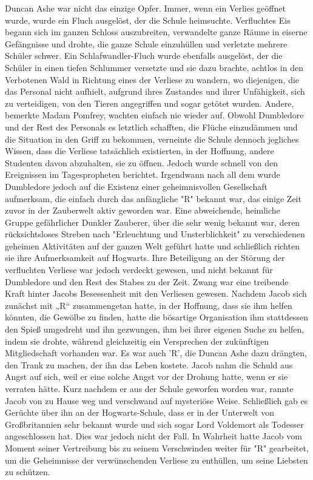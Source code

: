 \documentclass[a4paper, 10pt]{article}
\begin{document}
Duncan Ashe war nicht das einzige Opfer. Immer, wenn ein Verlies geöffnet wurde, wurde ein Fluch ausgelöst, der die Schule heimsuchte. Verfluchtes Eis begann sich im ganzen Schloss auszubreiten, verwandelte ganze Räume in eiserne Gefängnisse und drohte, die ganze Schule einzuhüllen und verletzte mehrere Schüler schwer. Ein Schlafwandler-Fluch wurde ebenfalls ausgelöst, der die Schüler in einen tiefen Schlummer versetzte und sie dazu brachte, achtlos in den Verbotenen Wald in Richtung eines der Verliese zu wandern, wo diejenigen, die das Personal nicht aufhielt, aufgrund ihres Zustandes und ihrer Unfähigkeit, sich zu verteidigen, von den Tieren angegriffen und sogar getötet wurden. Andere, bemerkte Madam Pomfrey, wachten einfach nie wieder auf. Obwohl Dumbledore und der Rest des Personals es letztlich schafften, die Flüche einzudämmen und die Situation in den Griff zu bekommen, verneinte die Schule dennoch jegliches Wissen, dass die Verliese tatsächlich existierten, in der Hoffnung, andere Studenten davon abzuhalten, sie zu öffnen. Jedoch wurde schnell von den Ereignissen im Tagespropheten berichtet.
\vspace{10pt}
\newline
{}  
Irgendwann nach all dem wurde Dumbledore jedoch auf die Existenz einer geheimnisvollen Gesellschaft aufmerksam, die einfach durch das anfängliche "R" bekannt war, das einige Zeit zuvor in der Zauberwelt aktiv geworden war. Eine abweichende, heimliche Gruppe gefährlicher Dunkler Zauberer, über die sehr wenig bekannt war, deren rücksichtsloses Streben nach "Erleuchtung und Unsterblichkeit" zu verschiedenen geheimen Aktivitäten auf der ganzen Welt geführt hatte und schließlich richten sie ihre Aufmerksamkeit auf Hogwarts. Ihre Beteiligung an der Störung der verfluchten Verliese war jedoch verdeckt gewesen, und nicht bekannt für Dumbledore und den Rest des Stabes zu der Zeit. Zwang war eine treibende Kraft hinter Jacobs Besessenheit mit den Verliesen gewesen. Nachdem Jacob sich zunächst mit „R“ zusammengetan hatte, in der Hoffnung, dass sie ihm helfen könnten, die Gewölbe zu finden, hatte die bösartige Organisation ihm stattdessen den Spieß umgedreht und ihn gezwungen, ihm bei ihrer eigenen Suche zu helfen, indem sie drohte, während gleichzeitig ein Versprechen der zukünftigen Mitgliedschaft vorhanden war. Es war auch 'R', die Duncan Ashe dazu drängten, den Trank zu machen, der ihn das Leben kostete. Jacob nahm die Schuld aus Angst auf sich, weil er eine solche Angst vor der Drohung hatte, wenn er sie verraten hätte.
\vspace{10pt}
\newline
{}  
Kurz nachdem er aus der Schule geworfen worden war, rannte Jacob von zu Hause weg und verschwand auf mysteriöse Weise. Schließlich gab es Gerüchte über ihn an der Hogwarts-Schule, dass er in der Unterwelt von Großbritannien sehr bekannt wurde und sich sogar Lord Voldemort als Todesser angeschlossen hat. Dies war jedoch nicht der Fall. In Wahrheit hatte Jacob vom
Moment seiner Vertreibung bis zu seinem Verschwinden weiter für "R" gearbeitet, um die Geheimnisse der verwünschenden Verliese zu enthüllen, um seine Liebsten zu schützen.
\end{document}
